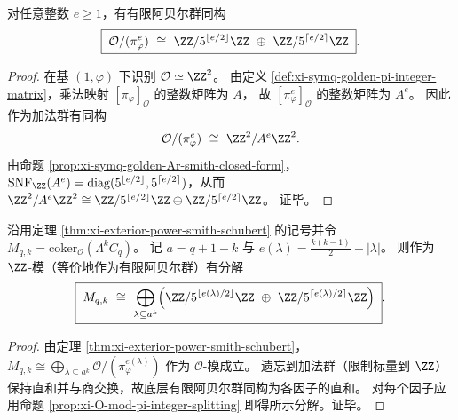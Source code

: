 \begin{proposition}\label{prop:xi-O-mod-pi-integer-splitting}
对任意整数 \(e\ge 1\)，有有限阿贝尔群同构
\[
\boxed{\;
\mathcal O/(\pi_\varphi^{e})
\ \cong\
\ZZ/5^{\lfloor e/2\rfloor}\ZZ\ \oplus\ \ZZ/5^{\lceil e/2\rceil}\ZZ\; }.
\]
\end{proposition}
\begin{proof}
在基 \((1,\varphi)\) 下识别 \(\mathcal O\simeq \ZZ^2\)。
由定义 \ref{def:xi-symq-golden-pi-integer-matrix}，乘法映射 \([\pi_\varphi]_{\mathcal O}\) 的整数矩阵为 \(A\)，
故 \([\pi_\varphi^{e}]_{\mathcal O}\) 的整数矩阵为 \(A^e\)。
因此作为加法群有同构
\[
\mathcal O/(\pi_\varphi^{e})\ \cong\ \ZZ^2/A^{e}\ZZ^2.
\]
由命题 \ref{prop:xi-symq-golden-Ar-smith-closed-form}，
\(
\mathrm{SNF}_{\ZZ}(A^{e})=\mathrm{diag}(5^{\lfloor e/2\rfloor},5^{\lceil e/2\rceil})
\)，从而
\(
\ZZ^2/A^{e}\ZZ^2\cong \ZZ/5^{\lfloor e/2\rfloor}\ZZ\oplus \ZZ/5^{\lceil e/2\rceil}\ZZ
\)。
证毕。
\end{proof}

\begin{corollary}[外幂余核的整数分解]\label{cor:xi-exterior-power-cokernel-integer-splitting}
沿用定理 \ref{thm:xi-exterior-power-smith-schubert} 的记号并令 \(M_{q,k}=\mathrm{coker}_{\mathcal O}(\Lambda^k C_q)\)。
记 \(a=q+1-k\) 与 \(e(\lambda)=\frac{k(k-1)}{2}+|\lambda|\)。
则作为 \(\ZZ\)-模（等价地作为有限阿贝尔群）有分解
\[
\boxed{\;
M_{q,k}\ \cong\
\bigoplus_{\lambda\subseteq a^k}\Bigl(\ZZ/5^{\lfloor e(\lambda)/2\rfloor}\ZZ\ \oplus\ \ZZ/5^{\lceil e(\lambda)/2\rceil}\ZZ\Bigr)\; }.
\]
\end{corollary}
\begin{proof}
由定理 \ref{thm:xi-exterior-power-smith-schubert}，
\(
M_{q,k}\cong \bigoplus_{\lambda\subseteq a^k}\mathcal O/(\pi_\varphi^{e(\lambda)})
\)
作为 \(\mathcal O\)-模成立。
遗忘到加法群（限制标量到 \(\ZZ\)）保持直和并与商交换，故底层有限阿贝尔群同构为各因子的直和。
对每个因子应用命题 \ref{prop:xi-O-mod-pi-integer-splitting} 即得所示分解。证毕。
\end{proof}

